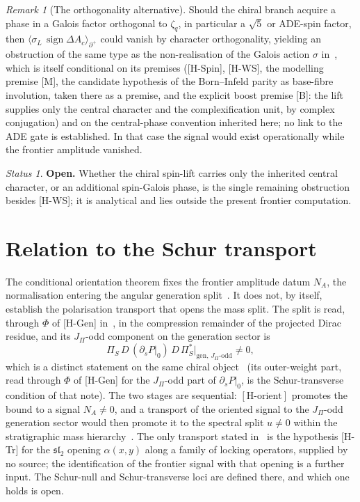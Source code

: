 \documentclass[11pt]{article}
\theoremstyle{plain}
\theoremstyle{remark}
\newtheorem{remark}{Remark}
\newtheorem*{status}{Status}
\newcommand{\zq}{\zeta_q}
\newcommand{\dac}{\Delta A_c}
\newcommand{\JPi}{J_\Pi}
\newcommand{\NA}{N_A}
\newcommand{\PiS}{\Pi_S}
\newcommand{\sgn}{\operatorname{sign}}
\newcommand{\Horient}{[\mathrm{H\text{-}orient}]}
\begin{document}
    \begin{remark}[The orthogonality alternative]
Should the chiral branch acquire a phase in a Galois factor orthogonal to $\zq$, in particular a $\sqrt{5}$ or
ADE-spin factor, then $\langle\sigma_L\,\sgn\dac\rangle_{\partial^+}$ could vanish by character
orthogonality, yielding an obstruction of the same type as the non-realisation of the Galois action $\sigma$
in~\cite{Beau2026aog}, which is itself conditional on its premises ([H-Spin], [H-WS], the modelling premise [M], the
candidate hypothesis of the Born--Infeld parity as base-fibre involution, taken there as a premise, and the
explicit boost premise [B]: the lift supplies only the central character and the complexification unit, by complex
conjugation) and on the central-phase convention inherited here; no link to the ADE gate is established.
In that case the signal would exist operationally while the frontier amplitude vanished.
    \end{remark}

    \begin{status}\textbf{Open.}
      Whether the chiral spin-lift carries only the inherited central character, or an additional spin-Galois phase, is the
      single remaining obstruction besides [H-WS]; it is analytical and lies outside the present frontier computation.\end{status}

  \section{Relation to the Schur transport}

    The conditional orientation theorem fixes the frontier amplitude datum $\NA$, the normalisation entering the angular
    generation split~\cite{Beau2026q11of,Beau2026bim}.
    It does not, by itself, establish the polarisation transport that opens the mass split.
    The split is read, through $\Phi$ of [H-Gen] in~\cite{Beau2026prs}, in the compression remainder of the projected
    Dirac residue, and its $\JPi$-odd component on the generation sector is
    \begin{equation}
      \PiS\, D\,(\partial_s P|_0)\, D\,\PiS^{*}\Big|_{\mathrm{gen},\,\JPi\text{-odd}} \neq 0,
    \end{equation}
    which is a distinct statement on the same chiral object~\cite{Beau2026prs} (its outer-weight part, read through
    $\Phi$ of [H-Gen] for the $\JPi$-odd part of $\partial_sP|_0$, is the Schur-transverse condition of that note).
    The two stages are sequential: $\Horient$ promotes the bound to a signal $\NA\neq 0$, and a transport of the
    oriented signal to the $\JPi$-odd generation sector would then promote it to the spectral split $u\neq 0$ within
    the stratigraphic mass hierarchy~\cite{Beau2026a4}.
    The only transport stated in~\cite{Beau2026prs} is the hypothesis [H-Tr] for the $\mathfrak{sl}_2$ opening
    $\alpha(x,y)$ along a family of locking operators, supplied by no source; the identification of the frontier
    signal with that opening is a further input.
    The Schur-null and Schur-transverse loci are defined there, and which one holds is open.
\end{document}
